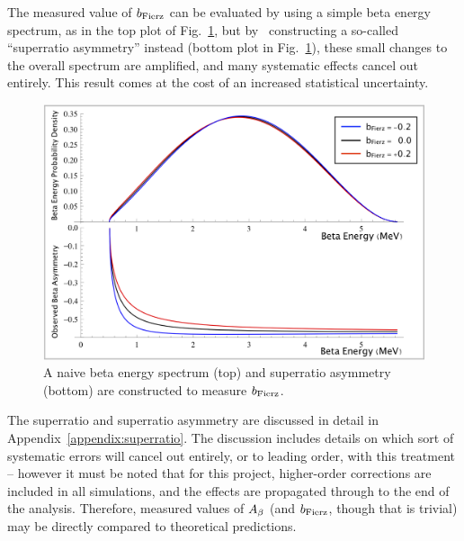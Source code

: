 The measured value of $\bFierz$ can be evaluated by using a simple beta energy spectrum, as in the top plot of Fig.~\ref{fig:FierzSignature}, but by~ constructing a so-called ``superratio asymmetry'' instead (bottom plot in Fig.~\ref{fig:FierzSignature}), these small changes to the overall spectrum are amplified, and many systematic effects cancel out entirely.  This result comes at the cost of an increased statistical uncertainty.
\begin{figure}[h!!t]
	\centering
	\includegraphics[width=.999\linewidth]
	{Figures/Fierz_Signature.png}
	\caption[Naive Beta Energy Spectrum and Superratio Asymmetry to Measure $\bFierz$]{A naive beta energy spectrum (top) and superratio asymmetry (bottom) are constructed to measure $\bFierz$.}	
	\label{fig:FierzSignature}
\end{figure}

The superratio and superratio asymmetry are discussed in detail in Appendix~\ref{appendix:superratio}.  The discussion includes details on which sort of systematic errors will cancel out entirely, or to leading order, with this treatment -- however it must be noted that for this project, higher-order corrections are included in all simulations, and the effects are propagated through to the end of the analysis.  Therefore, measured values of $A_{\beta}$ (and $\bFierz$, though that is trivial) may be directly compared to theoretical predictions.  

